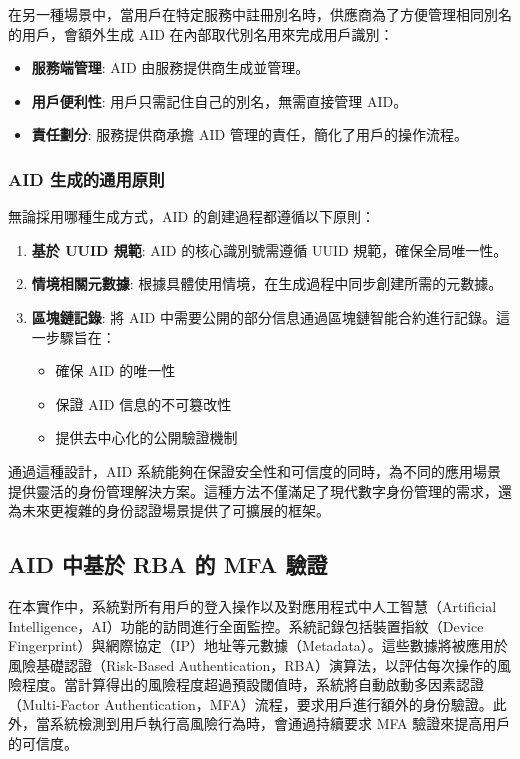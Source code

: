 在另一種場景中，當用戶在特定服務中註冊別名時，供應商為了方便管理相同別名的用戶，會額外生成 AID 在內部取代別名用來完成用戶識別：

\begin{itemize}
  \item \textbf{服務端管理}: AID 由服務提供商生成並管理。
  \item \textbf{用戶便利性}: 用戶只需記住自己的別名，無需直接管理 AID。
  \item \textbf{責任劃分}: 服務提供商承擔 AID 管理的責任，簡化了用戶的操作流程。
\end{itemize}

\subsubsection{AID 生成的通用原則}

無論採用哪種生成方式，AID 的創建過程都遵循以下原則：

\begin{enumerate}
  \item \textbf{基於 UUID 規範}: AID 的核心識別號需遵循 UUID 規範，確保全局唯一性。
  \item \textbf{情境相關元數據}: 根據具體使用情境，在生成過程中同步創建所需的元數據。
  \item \textbf{區塊鏈記錄}: 將 AID 中需要公開的部分信息通過區塊鏈智能合約進行記錄。這一步驟旨在：
        \begin{itemize}
          \item 確保 AID 的唯一性
          \item 保證 AID 信息的不可篡改性
          \item 提供去中心化的公開驗證機制
        \end{itemize}
\end{enumerate}

通過這種設計，AID 系統能夠在保證安全性和可信度的同時，為不同的應用場景提供靈活的身份管理解決方案。這種方法不僅滿足了現代數字身份管理的需求，還為未來更複雜的身份認證場景提供了可擴展的框架。

\subsection{AID 中基於 RBA 的 MFA 驗證}

在本實作中，系統對所有用戶的登入操作以及對應用程式中人工智慧（Artificial Intelligence，AI）功能的訪問進行全面監控。系統記錄包括裝置指紋（Device Fingerprint）與網際協定（IP）地址等元數據（Metadata）。這些數據將被應用於風險基礎認證（Risk-Based Authentication，RBA）演算法，以評估每次操作的風險程度。當計算得出的風險程度超過預設閾值時，系統將自動啟動多因素認證（Multi-Factor Authentication，MFA）流程，要求用戶進行額外的身份驗證。此外，當系統檢測到用戶執行高風險行為時，會通過持續要求 MFA 驗證來提高用戶的可信度。

